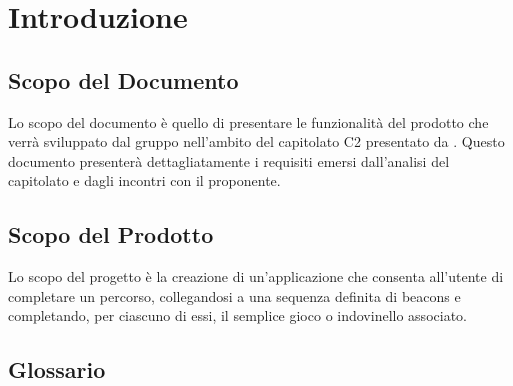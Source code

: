 \section{Introduzione}
\label{sec:Introduzione}

\subsection{Scopo del Documento}
\label{sub:ScopoDocumento}

Lo scopo del documento è quello di presentare le funzionalità del prodotto che verrà sviluppato dal gruppo \AUTORE nell'ambito del capitolato C2 presentato da \PROPONENTE. Questo documento presenterà dettagliatamente i requisiti emersi dall'analisi del capitolato e dagli incontri con il proponente.

\subsection{Scopo del Prodotto}
\label{sub:ScopoProdotto}

Lo scopo del progetto è la creazione di un'applicazione che consenta all'utente di completare un percorso, collegandosi a una sequenza definita di beacons e completando, per ciascuno di essi, il semplice gioco o indovinello associato.

\subsection{Glossario}
\label{sub:Glossario}
\GLOSSARIO

